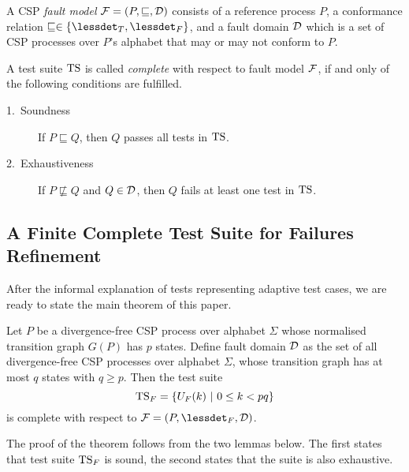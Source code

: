A CSP 
\emph{fault model} ${\cal F} = (P,\sqsubseteq,{\cal D})$ consists of a reference process
$P$, a conformance relation $\sqsubseteq \in \{\lessdet_T, \lessdet_F\}$, and a fault domain 
${\cal D}$ which is a set of CSP processes over $P$'s alphabet that may or may not conform to $P$.

A test suite ${\text{TS}}$ is called \emph{complete} with respect to fault model ${\cal F}$,
if and only of the following conditions are fulfilled.
\begin{description}
\item[1.~Soundness] If $P \sqsubseteq Q$, then $Q$ passes all tests in ${\text{TS}}$.
\item[2.~Exhaustiveness] If $P \not\sqsubseteq Q$ and $Q\in{\cal D}$, 
then $Q$ fails at least one test in ${\text{TS}}$.
\end{description} 


\subsection{A Finite Complete Test Suite for Failures Refinement}

After the informal explanation of tests representing adaptive test cases, we are ready to state the main theorem of this paper.

\begin{theorem}\label{th:failurestest}
Let $P$ be a divergence-free CSP process over alphabet $\Sigma$
whose normalised transition graph $G(P)$ has $p$ states. Define fault domain ${\cal D}$ as
the set of all divergence-free CSP processes over alphabet $\Sigma$, whose transition graph
has at most $q$ states with $q \ge p$.
Then the test suite
\[
{\text{TS}}_F = \{ U_F(k)~|~0 \le k < pq  \}
\]
is complete with respect to ${\cal F} = (P,\lessdet_F,{\cal D})$.
\end{theorem}


The proof of the theorem follows from the two lemmas below. The first states that test
suite ${\text{TS}}_F$ is sound, the second states that the suite is also exhaustive.

